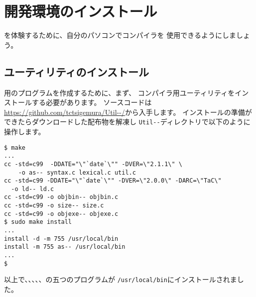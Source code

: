 % 
%
\chapter{\cmml 開発環境のインストール}

\cmml を体験するために、自分のパソコンで\cmm コンパイラを
使用できるようにしましょう。


\section{ユーティリティのインストール}

\tac 用のプログラムを作成するために、まず、
\cmm コンパイラ用ユーティリティをインストールする必要があります。
ソースコードは
\url{https://github.com/tctsigemura/Util--/}から入手します。
インストールの準備ができたらダウンロードした配布物を解凍し
\verb/Util--/ディレクトリで以下のように操作します。

\begin{mylist}
\begin{verbatim}
$ make
...
cc -std=c99  -DDATE="\"`date`\"" -DVER=\"2.1.1\" \
	-o as-- syntax.c lexical.c util.c
cc -std=c99 -DDATE="\"`date`\"" -DVER=\"2.0.0\" -DARC=\"TaC\"
  -o ld-- ld.c
cc -std=c99 -o objbin-- objbin.c
cc -std=c99 -o size-- size.c
cc -std=c99 -o objexe-- objexe.c
$ sudo make install
...
install -d -m 755 /usr/local/bin
install -m 755 as-- /usr/local/bin
...
$
\end{verbatim}
\end{mylist}

以上で、\as 、\ld 、\objbin 、\objexe 、\size の五つのプログラムが
\verb;/usr/local/bin;にインストールされました。

